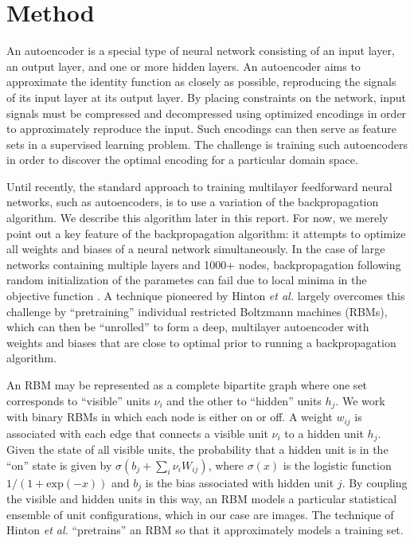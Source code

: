 \documentclass{article}
\begin{document}
\section{Method}\label{sec:method}

An autoencoder is a special type of neural network consisting of an input layer,
an output layer, and one or more hidden layers. An autoencoder aims to
approximate the identity function as closely as possible, reproducing the
signals of its input layer at its output layer. By placing constraints on the
network, input signals must be compressed and decompressed using optimized
encodings in order to approximately reproduce the input. Such encodings can then
serve as feature sets in a supervised learning problem. The challenge is
training such autoencoders in order to discover the optimal encoding for a
particular domain space.

Until recently, the standard approach to training multilayer feedforward neural
networks, such as autoencoders, is to use a variation of the backpropagation
algorithm. We describe this algorithm later in this report. For now, we merely
point out a key feature of the backpropagation algorithm: it attempts to
optimize all weights and biases of a neural network simultaneously. In the case
of large networks containing multiple layers and 1000+ nodes, backpropagation
following random initialization of the parametes can fail due to local minima in
the objective function \cite{art:KL}. A technique pioneered by Hinton {\em et al.}
\cite{art:HS} largely overcomes this challenge by ``pretraining'' individual
restricted Boltzmann machines (RBMs), which can then be ``unrolled'' to form a
deep, multilayer autoencoder with weights and biases that are close to optimal
prior to running a backpropagation algorithm.

An RBM may be represented as a complete bipartite graph where one set
corresponds to ``visible'' units $\nu_i$ and the other to ``hidden'' units
$h_j$. We work with binary RBMs in which each node is either on or off. A weight
$w_{ij}$ is associated with each edge that connects a visible unit $\nu_i$ to a
hidden unit $h_j$. Given the state of all visible units, the probability that a
hidden unit is in the ``on'' state is given by
$\sigma\left(b_j + \sum_i{\nu_iW_{ij}}\right)$, where $\sigma (x)$ is the logistic function
$1/(1 + \mathrm{exp}(-x))$ and $b_j$ is the bias associated with hidden unit $j$. By
coupling the visible and hidden units in this way, an RBM models a particular
statistical ensemble of unit configurations, which in our case are images. The
technique of Hinton {\em et al.} ``pretrains'' an RBM so that it approximately
models a training set.
\end{document}
